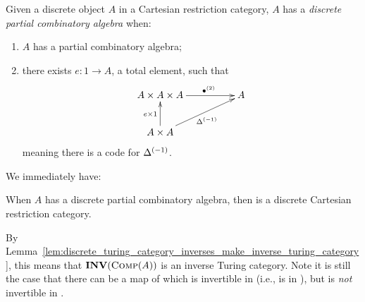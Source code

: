 \begin{definition}\label{def:discrete_pca}
  Given a discrete object $A$ in a Cartesian restriction category, $A$ has a \emph{discrete partial
    combinatory algebra} when:
  \begin{enumerate}[{(}i{)}]
  \item $A$ has a partial combinatory algebra;
  \item there exists $e:1\to A$, a total element, such that
    \[
      \xymatrix@C+25pt{
        A\times A \times A\ar[r]^(.6){\multibullet{2}} & A \\
        A\times A  \ar[u]^{e\times 1} \ar[ur]_{\inv{\Delta}}
      }
    \]
    meaning there is a code for ${\Delta}^{(-1)}$.
  \end{enumerate}
\end{definition}

We immediately have:
\begin{lemma}\label{lem:comp_a_is_discrete_cart}
  When $A$ has a discrete partial combinatory algebra, then \compa is a discrete Cartesian
  restriction category.
\end{lemma}
By Lemma~\ref{lem:discrete_turing_category_inverses_make_inverse_turing_category}, this means that
$\mathbf{INV}({\textsc{Comp}(A)})$ is an inverse Turing category. Note it is still the case that there can be a map of
\compa which is invertible in \Xt (i.e., is in \X), but is \emph{not} invertible in \compa.


